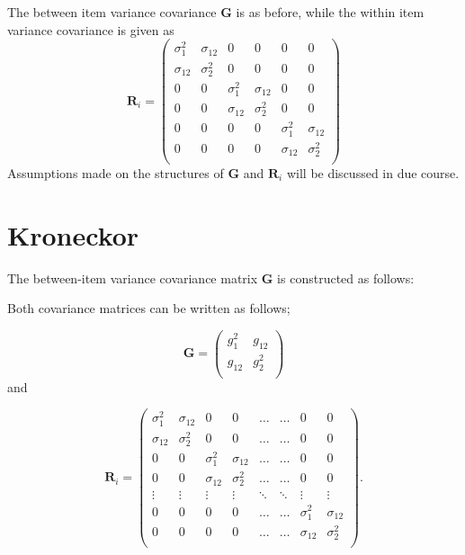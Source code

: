 \documentclass[12pt, a4paper]{report}
\theoremstyle{plain}
\theoremstyle{definition}
\theoremstyle{remark}
\begin{document}
	The between item variance covariance $\boldsymbol{G}$ is as before, while the within item variance covariance is given as
	\[
	\boldsymbol{R}_i = \left(
	\begin{array}{cccccc}
	\sigma^2_{1} & \sigma_{12} & 0 & 0 & 0 & 0 \\
	\sigma_{12} & \sigma^2_{2} & 0 & 0 & 0 & 0 \\
	0 & 0 & \sigma^2_{1} & \sigma_{12} & 0 & 0 \\
	0 & 0 & \sigma_{12} & \sigma^2_{2} & 0 & 0 \\
	0 & 0 & 0 & 0 & \sigma^2_{1} & \sigma_{12} \\
	0 & 0 & 0 & 0 & \sigma_{12} & \sigma^2_{2} \\
	\end{array} \right)
	\]
 Assumptions made on the structures of $\boldsymbol{G}$ and $\boldsymbol{R}_i$ will be discussed in due course.
 
\section{Kroneckor}

The between-item variance covariance matrix $\boldsymbol{G}$ is constructed as follows:

Both covariance matrices can be written as follows;


\[ \boldsymbol{G} =\left(
\begin{array}{cc}
g^2_1  & g_{12} \\
g_{12} & g^2_2 \\
\end{array}
\right) \]
and


\[ \boldsymbol{R}_i =\left(
\begin{array}{cccccccc}
\sigma^2_1  & \sigma_{12} & 0 & 0 & \ldots & \ldots & 0 & 0 \\
\sigma_{12} & \sigma^2_2  & 0 & 0  & \ldots & \ldots & 0 & 0\\

0 & 0 &\sigma^2_1  & \sigma_{12} & \ldots & \ldots& 0 &  0 \\
0 & 0 &\sigma_{12} & \sigma^2_2  & \ldots & \ldots & 0 & 0 \\
\vdots & \vdots &\vdots & \vdots & \ddots & \ddots& \vdots & \vdots \\

0 & 0 &0 & 0 & \ldots & \ldots&\sigma^2_1  & \sigma_{12} \\
0 & 0 &0 & 0 & \ldots & \ldots &\sigma_{12} & \sigma^2_2 \\
\end{array}
\right). \]
\end{document}
